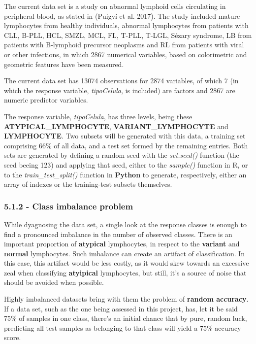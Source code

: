 \documentclass[]{article}
\begin{document}
The current data set is a study on abnormal lymphoid cells circulating
in peripheral blood, as stated in (Puigv{í} et al. 2017). The study
included mature lymphocytes from healthy individuals, abnormal
lymphocytes from patients with CLL, B-PLL, HCL, SMZL, MCL, FL, T-PLL,
T-LGL, Sézary syndrome, LB from patients with B-lymphoid precursor
neoplasms and RL from patients with viral or other infections, in which
2867 numerical variables, based on colorimetric and geometric features
have been measured.

The current data set has 13074 observations for 2874 variables, of which
7 (in which the response variable, \emph{tipoCelula}, is included) are
factors and 2867 are numeric predictor variables.

The response variable, \emph{tipoCelula}, has three levels, being these
\textbf{ATYPICAL\_LYMPHOCYTE}, \textbf{VARIANT\_LYMPHOCYTE} and
\textbf{LYMPHOCYTE}. Two subsets will be generated with this data, a
training set comprising 66\% of all data, and a test set formed by the
remaining entries. Both sets are generated by defining a random seed
with the \emph{set.seed()} function (the seed beeing 123) and applying
that seed, either to the \emph{sample()} function in R, or to the
\emph{train\_test\_split()} function in \textbf{Python} to generate,
respectively, either an array of indexes or the training-test subsets
themselves.

\subsubsection{5.1.2 - Class imbalance
problem}\label{class-imbalance-problem}

While dyagnosing the data set, a single look at the response classes is
enough to find a pronounced imbalance in the number of observed classes.
There is an important proportion of \textbf{atypical} lymphocytes, in
respect to the \textbf{variant} and \textbf{normal} lymphocytes. Such
imbalance can create an artifact of classification. In this case, this
artifact would be less costly, as it would skew towards an excessive
zeal when classifying \textbf{atyipical} lymphocytes, but still, it's a
source of noise that should be avoided when possible.

Highly imbalanced datasets bring with them the problem of \textbf{random
accuracy}. If a data set, such as the one being assessed in this
project, has, let it be said 75\% of samples in one class, there's an
initial chance that by pure, random luck, predicting all test samples as
belonging to that class will yield a 75\% accuracy score.
\end{document}
